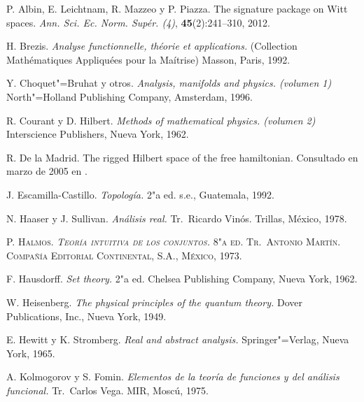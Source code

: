 \begin{thebibliography}{99}

 P. Albin, E. Leichtnam, R. Mazzeo y P. Piazza. The signature package on Witt spaces. \textit{Ann. Sci. Ec. Norm. Supér. (4)}, \textbf{45}(2):241--310, 2012.

 H. Brezis. \textit{Analyse functionnelle, théorie et applications.} (Collection Mathématiques Appliquées pour la Maítrise) Masson, Paris, 1992.

 Y. Choquet"=Bruhat y otros. \textit{Analysis, manifolds and physics. (volumen 1)} North"=Holland Publishing Company, Amsterdam, 1996.

 R. Courant y {D. Hilbert}. \textit{Methods of mathematical physics. (volumen 2)} Interscience Publishers, Nueva York, 1962.

 R. {De la Madrid}. The rigged {Hilbert} space of the free hamiltonian. Consultado en marzo de 2005 en .

 J. Escamilla-Castillo. \textit{Topología.} 2"a ed. s.e., Guatemala, 1992.

 N. Haaser y {J. Sullivan}. \textit{Análisis real.}  Tr.~Ricardo Vinós. Trillas, México, 1978.

\textsc{ P. Halmos. \textit{Teoría intuitiva de los conjuntos.} 8"a ed. Tr.~Antonio Martín. Compañía Editorial Continental, S.A., México, 1973.}

 F. Hausdorff. \textit{Set theory.} 2"a ed. Chelsea Publishing Company, Nueva York, 1962.

 W. Heisenberg. \textit{The physical principles of the quantum theory.} Dover Publications, Inc., Nueva York, 1949.

 E. Hewitt y {K. Stromberg}. \textit{Real and abstract analysis.} Springer"=Verlag, Nueva York, 1965.

 A. Kolmogorov y {S. Fomin}. \textit{Elementos de la teoría de funciones y del análisis funcional.} Tr.~Carlos Vega. MIR, Moscú, 1975.


\end{thebibliography}
